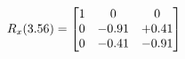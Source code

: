 \documentclass[preview]{standalone}
\begin{document}
\begin{align*}
\special{dvisvgm:raw <g id='unique000'>}R_{x}(3.56) = \begin{bmatrix}1 & 0 & 0 \\0 & -0.91 & +0.41 \\0 & -0.41 & -0.91\end{bmatrix}\special{dvisvgm:raw </g>}
\end{align*}
\end{document}
